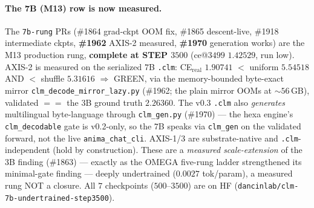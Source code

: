 \paragraph{The 7B (M13) row is now measured.} The
\texttt{7b-rung} PRs (\#1864 grad-ckpt OOM fix, \#1865 descent-live, \#1918
intermediate ckpts, \textbf{\#1962} AXIS-2 measured, \textbf{\#1970} generation works) are the
M13 production rung, \textbf{complete at STEP $3500$} (ce@$3499$
$1.42529$, run low). AXIS-2 is measured on the serialized $7$B \texttt{.clm}: CE$_\text{real}$
$\mathbf{1.90741}$ $<$ uniform $5.54518$ AND $<$ shuffle $5.31616$ $\Rightarrow$ GREEN, via the
memory-bounded byte-exact mirror \texttt{clm\_decode\_mirror\_lazy.py} (\#1962; the plain mirror
OOMs at $\sim$$56$\,GB), validated $==$ the $3$B ground truth $2.26360$. The v0.3 \texttt{.clm}
also \emph{generates} multilingual byte-language through \texttt{clm\_gen.py} (\#1970) --- the
hexa engine's \texttt{clm\_decodable} gate is v0.2-only, so the $7$B speaks via \texttt{clm\_gen}
on the validated forward, not the live \texttt{anima\_chat\_cli}. AXIS-1/3 are substrate-native
and \texttt{.clm}-independent (hold by construction). These are a \emph{measured scale-extension}
of the 3B finding (\#1863) --- exactly as the OMEGA five-rung ladder strengthened its
minimal-gate finding --- deeply undertrained ($0.0027$ tok/param), a measured rung NOT a closure.
All $7$ checkpoints ($500$--$3500$) are on HF (\texttt{dancinlab/clm-7b-undertrained-step3500}).
